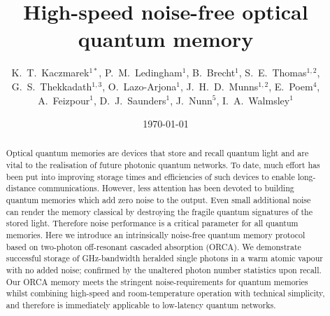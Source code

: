 \documentclass[%
 reprint,
 amsmath,amssymb,
 aps,
 pra,
]{revtex4-1}
\begin{document}

\title{High-speed noise-free optical quantum memory}

\author{K.~T.~Kaczmarek$^{1*}$, P.~M.~Ledingham$^1$, B.~Brecht$^1$, S.~E.~Thomas$^{1,2}$, G.~S.~Thekkadath$^{1,3}$, O.~Lazo-Arjona$^1$, J.~H.~D.~Munns$^{1,2}$, E.~Poem$^{4}$, A.~Feizpour$^1$, D.~J.~Saunders$^1$, J.~Nunn$^{5}$, I.~A.~Walmsley$^{1}$}


%


\date{\today}


\begin{abstract}
Optical quantum memories are devices that store and recall quantum light and are vital to the realisation of future photonic quantum networks. To date, much effort has been put into improving storage times and efficiencies of such devices to enable long-distance communications. However, less attention has been devoted to building quantum memories which add zero noise to the output. Even small additional noise can render the memory classical by destroying the fragile quantum signatures of the stored light. Therefore noise performance is a critical parameter for all quantum memories. Here we introduce an intrinsically noise-free quantum memory protocol based on two-photon off-resonant cascaded absorption (ORCA). We demonstrate successful storage of GHz-bandwidth heralded single photons in a warm atomic vapour with no added noise; confirmed by the unaltered photon number statistics upon recall. Our ORCA memory meets the stringent noise-requirements for quantum memories whilst combining high-speed and room-temperature operation with technical simplicity, and therefore is immediately applicable to low-latency quantum networks.
\end{abstract}

\maketitle
\end{document}
